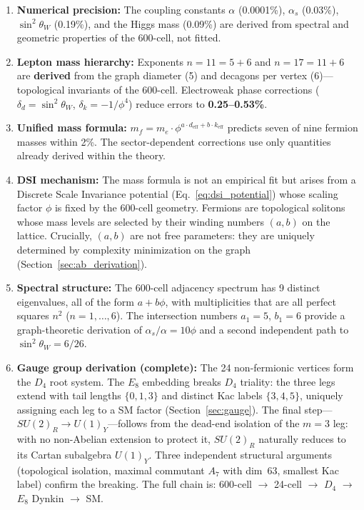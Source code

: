 \documentclass[12pt,a4paper]{article}
\begin{document}
\begin{enumerate}
    \item \textbf{Numerical precision:} The coupling constants $\alpha$ (0.0001\%), $\alpha_s$ (0.03\%), $\sin^2\theta_W$ (0.19\%), and the Higgs mass (0.09\%) are derived from spectral and geometric properties of the 600-cell, not fitted.

    \item \textbf{Lepton mass hierarchy:} Exponents $n=11=5+6$ and $n=17=11+6$ are \textbf{derived} from the graph diameter (5) and decagons per vertex (6)---topological invariants of the 600-cell. Electroweak phase corrections ($\delta_d = \sin^2\theta_W$, $\delta_k = -1/\phi^4$) reduce errors to \textbf{0.25--0.53\%}.

    \item \textbf{Unified mass formula:} $m_f = m_e \cdot \phi^{a \cdot d_{\text{eff}} + b \cdot k_{\text{eff}}}$ predicts seven of nine fermion masses within 2\%. The sector-dependent corrections use only quantities already derived within the theory.

    \item \textbf{DSI mechanism:} The mass formula is not an empirical fit but arises from a Discrete Scale Invariance potential (Eq.~\ref{eq:dsi_potential}) whose scaling factor $\phi$ is fixed by the 600-cell geometry. Fermions are topological solitons whose mass levels are selected by their winding numbers $(a,b)$ on the lattice. Crucially, $(a,b)$ are not free parameters: they are uniquely determined by complexity minimization on the graph (Section~\ref{sec:ab_derivation}).

    \item \textbf{Spectral structure:} The 600-cell adjacency spectrum has 9 distinct eigenvalues, all of the form $a + b\phi$, with multiplicities that are all perfect squares $n^2$ ($n = 1, \ldots, 6$). The intersection numbers $a_1 = 5$, $b_1 = 6$ provide a graph-theoretic derivation of $\alpha_s/\alpha = 10\phi$ and a second independent path to $\sin^2\theta_W = 6/26$.

    \item \textbf{Gauge group derivation (complete):} The 24 non-fermionic vertices form the $D_4$ root system. The $E_8$ embedding breaks $D_4$ triality: the three legs extend with tail lengths $\{0, 1, 3\}$ and distinct Kac labels $\{3, 4, 5\}$, uniquely assigning each leg to a SM factor (Section~\ref{sec:gauge}). The final step---$SU(2)_R \to U(1)_Y$---follows from the dead-end isolation of the $m=3$ leg: with no non-Abelian extension to protect it, $SU(2)_R$ naturally reduces to its Cartan subalgebra $U(1)_Y$. Three independent structural arguments (topological isolation, maximal commutant $A_7$ with dim~63, smallest Kac label) confirm the breaking. The full chain is: 600-cell $\to$ 24-cell $\to$ $D_4$ $\to$ $E_8$ Dynkin $\to$ SM.


\end{enumerate}
\end{document}
